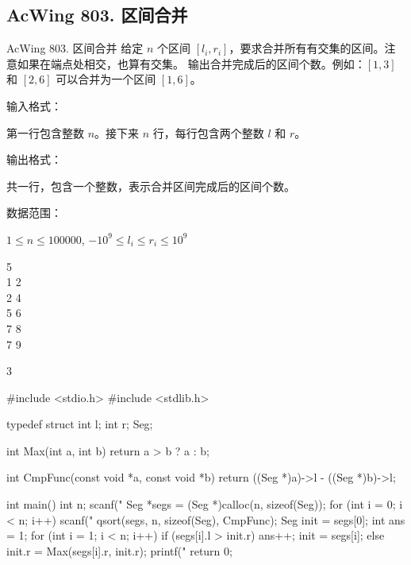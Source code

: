\subsection{AcWing 803. 区间合并}
\begin{titledbox}{AcWing 803. 区间合并}
给定 $n$ 个区间 $[l_i, r_i]$，要求合并所有有交集的区间。注意如果在端点处相交，也算有交集。
输出合并完成后的区间个数。例如：$[1,3]$ 和 $[2,6]$ 可以合并为一个区间 $[1,6]$。

输入格式：

第一行包含整数 $n$。接下来 $n$ 行，每行包含两个整数 $l$ 和 $r$。

输出格式：

共一行，包含一个整数，表示合并区间完成后的区间个数。

数据范围：

$1 \le n \le 100000$, $-10^9 \le l_i \le r_i \le 10^9$

\begin{inputblock}
    5 \\
    1 2 \\
    2 4 \\
    5 6 \\
    7 8 \\
    7 9
\end{inputblock}
\begin{outputblock}
    3
\end{outputblock}
\end{titledbox}

\begin{mycpptwocol}[区间合并]
#include <stdio.h>
#include <stdlib.h>

typedef struct {
    int l;
    int r;
} Seg;

int Max(int a, int b)
{
    return a > b ? a : b;
}

int CmpFunc(const void *a, const void *b)
{
    return ((Seg *)a)->l - ((Seg *)b)->l;
}

int main()
{
    int n;
    scanf("%
    Seg *segs = (Seg *)calloc(n, sizeof(Seg));
    for (int i = 0; i < n; i++) {
        scanf("%
    }
    qsort(segs, n, sizeof(Seg), CmpFunc);
    Seg init = segs[0];
    int ans = 1;
    for (int i = 1; i < n; i++) {
        if (segs[i].l > init.r) {
            ans++;
            init = segs[i];
        } else {
            init.r = Max(segs[i].r, init.r);
        }
    }
    printf("%
    return 0;
}
\end{mycpptwocol}